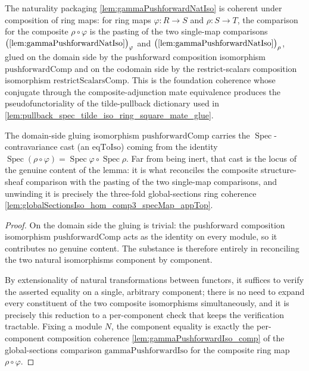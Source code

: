 \begin{lemma}


  \label{lem:gammaPushforwardNatIso_comp}
  The naturality packaging \cref{lem:gammaPushforwardNatIso} is coherent under composition of
  ring maps: for ring maps \(\varphi : R \to S\) and \(\rho : S \to T\), the comparison for the
  composite \(\rho \circ \varphi\) is the pasting of the two single-map comparisons
  \(\bigl(\text{\cref{lem:gammaPushforwardNatIso}}\bigr)_\varphi\) and
  \(\bigl(\text{\cref{lem:gammaPushforwardNatIso}}\bigr)_\rho\), glued on the domain side by the
  pushforward composition isomorphism \(\mathrm{pushforwardComp}\) and on the codomain side by the
  restrict-scalars composition isomorphism \(\mathrm{restrictScalarsComp}\). This is the foundation
  coherence whose conjugate through the composite-adjunction mate equivalence produces the
  pseudofunctoriality of the tilde-pullback dictionary used in
  \cref{lem:pullback_spec_tilde_iso_ring_square_mate_glue}.

  The domain-side gluing isomorphism \(\mathrm{pushforwardComp}\) carries the
  \(\operatorname{Spec}\)-contravariance cast (an \(\mathrm{eqToIso}\)) coming from the
  identity \(\operatorname{Spec}(\rho\circ\varphi) = \operatorname{Spec}\varphi \circ
  \operatorname{Spec}\rho\). Far from being inert, that cast is the locus of the genuine
  content of the lemma: it is what reconciles the composite structure-sheaf comparison
  with the pasting of the two single-map comparisons, and unwinding it is precisely the
  three-fold global-sections ring coherence
  \cref{lem:globalSectionsIso_hom_comp3_specMap_appTop}.
  \begin{proof}
    On the domain side the gluing is trivial: the pushforward composition isomorphism
    \(\mathrm{pushforwardComp}\) acts as the identity on every module, so it contributes no
    genuine content. The substance is therefore entirely in reconciling the two natural
    isomorphisms component by component.

    By extensionality of natural transformations between functors, it suffices to verify
    the asserted equality on a single, arbitrary component; there is no need to expand
    every constituent of the two composite isomorphisms simultaneously, and it is precisely
    this reduction to a per-component check that keeps the verification tractable. Fixing a
    module \(N\), the component equality is exactly the per-component composition coherence
    \cref{lem:gammaPushforwardIso_comp} of the global-sections comparison
    \(\mathrm{gammaPushforwardIso}\) for the composite ring map \(\rho\circ\varphi\).


\end{proof}
\end{lemma}
